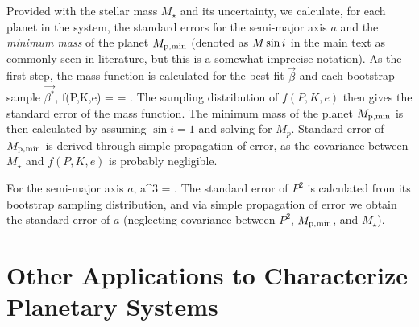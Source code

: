 Provided with the stellar mass $M_\star$ and its uncertainty, we
calculate, for each planet in the system, the standard errors for the
semi-major axis $a$ and the {\it minimum mass} of the planet $M_{\rm
  p,min}$ (denoted as $M\sin{i}$ in the main text as commonly seen in
literature, but this is a somewhat imprecise notation). As the first
step, the mass function is calculated for the best-fit $\vec{\beta}$
and each bootstrap sample $\vec{\beta^*}$,
\beq
f(P,K,e) =  = .
\eeq
The sampling distribution of $f(P,K,e)$ then gives the standard error
of the mass function. The minimum mass of the planet $M_{\rm p,min}$ 
is then calculated by assuming $\sin{i}=1$ and solving for $M_p$.
Standard error of $M_{\rm p,min}$ is derived through simple
propagation of error, as the covariance between $M_\star$ and
$f(P,K,e)$ is probably negligible.

For the semi-major axis $a$,
\beq
a^3 =  \approx {}.
\eeq
The standard error of $P^2$ is calculated from its bootstrap sampling
distribution, and via simple propagation of error we obtain the
standard error of $a$ (neglecting covariance between $P^2$, $M_{\rm
  p,min}$, and $M_\star$).


\section{Other Applications to Characterize Planetary Systems}


